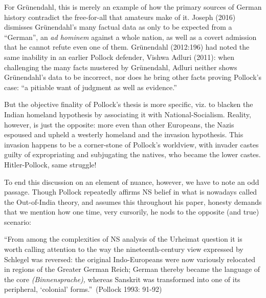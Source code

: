 For Grünendahl, this is merely an example of how the primary sources of German history contradict the free-for-all that amateurs make of it. Joseph (2016) dismisses Grünendahl’s many factual data as only to be expected from a “German”, an {\sl ad hominem} against a whole nation, as well as a covert admission that he cannot refute even one of them. Grünendahl (2012:196) had noted the same inability in an earlier Pollock defender, Vishwa Adluri (2011): when challenging the many facts mustered by Grünendahl, Adluri neither shows Grünendahl’s data to be incorrect, nor does he bring other facts proving Pollock’s case: “a pitiable want of judgment as well as evidence.”


But the objective finality of Pollock’s thesis is more specific, viz. to blacken the Indian homeland hypothesis by associating it with National-Socialism. Reality, however, is just the opposite: more even than other Europeans, the Nazis espoused and upheld a westerly homeland and the invasion hypothesis. This invasion happens to be a corner-stone of Pollock’s worldview, with invader castes guilty of expropriating and subjugating the natives, who became the lower castes. Hitler-Pollock, same struggle!

To end this discussion on an element of nuance, however, we have to note an odd passage.
Though Pollock repeatedly affirms NS belief in what is nowadays called the Out-of-India theory, and assumes this throughout his paper, honesty demands that we mention how one time, very cursorily, he nods to the opposite (and true) scenario: 
\begin{myquote}
“From among the complexities of NS analysis of the Urheimat question it is worth calling attention to the way the nineteenth-century view expressed by Schlegel was reversed: the original Indo-Europeans were now variously relocated in regions of the Greater German Reich; German thereby became the language of the core {\sl (Binnensprache),} whereas Sanskrit was transformed into one of its peripheral, ‘colonial’ forms.”~\hfill(Pollock 1993: 91-92)
\end{myquote}

